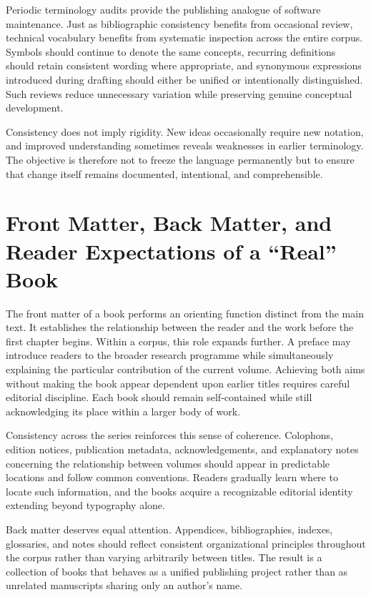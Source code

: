 Periodic terminology audits provide the publishing analogue of software maintenance. Just as bibliographic consistency benefits from occasional review, technical vocabulary benefits from systematic inspection across the entire corpus. Symbols should continue to denote the same concepts, recurring definitions should retain consistent wording where appropriate, and synonymous expressions introduced during drafting should either be unified or intentionally distinguished. Such reviews reduce unnecessary variation while preserving genuine conceptual development.

Consistency does not imply rigidity. New ideas occasionally require new notation, and improved understanding sometimes reveals weaknesses in earlier terminology. The objective is therefore not to freeze the language permanently but to ensure that change itself remains documented, intentional, and comprehensible.

\hypertarget{front-matter-back-matter-and-reader-expectations-of-a-real-book}{%
\section{Front Matter, Back Matter, and Reader Expectations of a ``Real'' Book}\label{front-matter-back-matter-and-reader-expectations-of-a-real-book}}

The front matter of a book performs an orienting function distinct from the main text. It establishes the relationship between the reader and the work before the first chapter begins. Within a corpus, this role expands further. A preface may introduce readers to the broader research programme while simultaneously explaining the particular contribution of the current volume. Achieving both aims without making the book appear dependent upon earlier titles requires careful editorial discipline. Each book should remain self-contained while still acknowledging its place within a larger body of work.

Consistency across the series reinforces this sense of coherence. Colophons, edition notices, publication metadata, acknowledgements, and explanatory notes concerning the relationship between volumes should appear in predictable locations and follow common conventions. Readers gradually learn where to locate such information, and the books acquire a recognizable editorial identity extending beyond typography alone.

Back matter deserves equal attention. Appendices, bibliographies, indexes, glossaries, and notes should reflect consistent organizational principles throughout the corpus rather than varying arbitrarily between titles. The result is a collection of books that behaves as a unified publishing project rather than as unrelated manuscripts sharing only an author's name.

